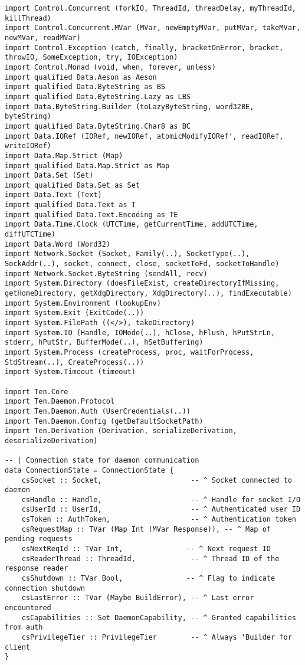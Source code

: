 \documentclass{article}
\begin{document}
\begin{tcolorbox}[title=Ten/Daemon/Client.hs Changes]
\begin{verbatim}
import Control.Concurrent (forkIO, ThreadId, threadDelay, myThreadId, killThread)
import Control.Concurrent.MVar (MVar, newEmptyMVar, putMVar, takeMVar, newMVar, readMVar)
import Control.Exception (catch, finally, bracketOnError, bracket, throwIO, SomeException, try, IOException)
import Control.Monad (void, when, forever, unless)
import qualified Data.Aeson as Aeson
import qualified Data.ByteString as BS
import qualified Data.ByteString.Lazy as LBS
import Data.ByteString.Builder (toLazyByteString, word32BE, byteString)
import qualified Data.ByteString.Char8 as BC
import Data.IORef (IORef, newIORef, atomicModifyIORef', readIORef, writeIORef)
import Data.Map.Strict (Map)
import qualified Data.Map.Strict as Map
import Data.Set (Set)
import qualified Data.Set as Set
import Data.Text (Text)
import qualified Data.Text as T
import qualified Data.Text.Encoding as TE
import Data.Time.Clock (UTCTime, getCurrentTime, addUTCTime, diffUTCTime)
import Data.Word (Word32)
import Network.Socket (Socket, Family(..), SocketType(..), SockAddr(..), socket, connect, close, socketToFd, socketToHandle)
import Network.Socket.ByteString (sendAll, recv)
import System.Directory (doesFileExist, createDirectoryIfMissing, getHomeDirectory, getXdgDirectory, XdgDirectory(..), findExecutable)
import System.Environment (lookupEnv)
import System.Exit (ExitCode(..))
import System.FilePath ((</>), takeDirectory)
import System.IO (Handle, IOMode(..), hClose, hFlush, hPutStrLn, stderr, hPutStr, BufferMode(..), hSetBuffering)
import System.Process (createProcess, proc, waitForProcess, StdStream(..), CreateProcess(..))
import System.Timeout (timeout)

import Ten.Core
import Ten.Daemon.Protocol
import Ten.Daemon.Auth (UserCredentials(..))
import Ten.Daemon.Config (getDefaultSocketPath)
import Ten.Derivation (Derivation, serializeDerivation, deserializeDerivation)

-- | Connection state for daemon communication
data ConnectionState = ConnectionState {
    csSocket :: Socket,                     -- ^ Socket connected to daemon
    csHandle :: Handle,                     -- ^ Handle for socket I/O
    csUserId :: UserId,                     -- ^ Authenticated user ID
    csToken :: AuthToken,                   -- ^ Authentication token
    csRequestMap :: TVar (Map Int (MVar Response)), -- ^ Map of pending requests
    csNextReqId :: TVar Int,               -- ^ Next request ID
    csReaderThread :: ThreadId,             -- ^ Thread ID of the response reader
    csShutdown :: TVar Bool,               -- ^ Flag to indicate connection shutdown
    csLastError :: TVar (Maybe BuildError), -- ^ Last error encountered
    csCapabilities :: Set DaemonCapability, -- ^ Granted capabilities from auth
    csPrivilegeTier :: PrivilegeTier        -- ^ Always 'Builder for client
}


\end{verbatim}
\end{tcolorbox}
\end{document}
